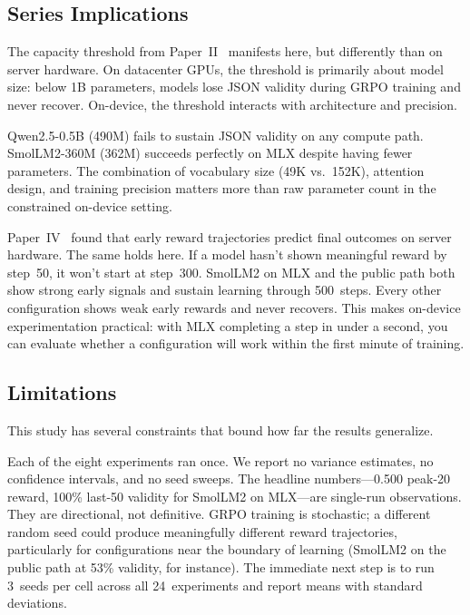\documentclass[11pt]{article}
\begin{document}
\subsection{Series Implications}

The capacity threshold from Paper~II~\cite{maloney2025capacity} manifests here, but differently than on server hardware.  On datacenter GPUs, the threshold is primarily about model size: below 1B parameters, models lose JSON validity during GRPO training and never recover.  On-device, the threshold interacts with architecture and precision.

Qwen2.5-0.5B (490M) fails to sustain JSON validity on any compute path.  SmolLM2-360M (362M) succeeds perfectly on MLX despite having fewer parameters.  The combination of vocabulary size (49K vs.~152K), attention design, and training precision matters more than raw parameter count in the constrained on-device setting.

Paper~IV~\cite{maloney2025dynamics} found that early reward trajectories predict final outcomes on server hardware.  The same holds here.  If a model hasn't shown meaningful reward by step~50, it won't start at step~300.  SmolLM2 on MLX and the public path both show strong early signals and sustain learning through 500~steps.  Every other configuration shows weak early rewards and never recovers.  This makes on-device experimentation practical: with MLX completing a step in under a second, you can evaluate whether a configuration will work within the first minute of training.

\subsection{Limitations}

This study has several constraints that bound how far the results generalize.

Each of the eight experiments ran once.  We report no variance estimates, no confidence intervals, and no seed sweeps.  The headline numbers---0.500 peak-20 reward, 100\% last-50 validity for SmolLM2 on MLX---are single-run observations.  They are directional, not definitive.  GRPO training is stochastic; a different random seed could produce meaningfully different reward trajectories, particularly for configurations near the boundary of learning (SmolLM2 on the public path at 53\% validity, for instance).  The immediate next step is to run 3~seeds per cell across all 24~experiments and report means with standard deviations.
\end{document}

